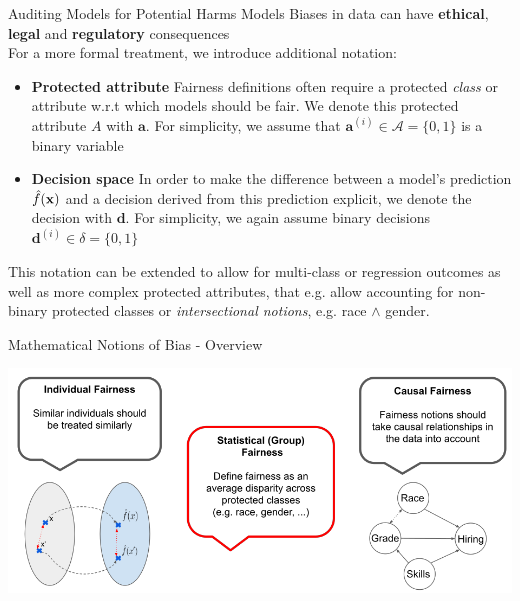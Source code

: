\documentclass[11pt,compress,t,notes=noshow, xcolor=table]{beamer}
\newcommand{\dv}{\mathbf{d}} %
\newcommand{\av}{\mathbf{a}} %
\newcommand{\Dspace}{\delta} %
\newcommand{\Aspace}{\mathcal{A}} %
\begin{document}
\begin{vbframe}{Auditing Models for Potential Harms}
  Models Biases in data can have \textbf{ethical}, \textbf{legal} and \textbf{regulatory} consequences \\
  For a more formal treatment, we introduce additional notation:
  \begin{itemize}
    \item \textbf{Protected attribute} Fairness definitions often require a protected \emph{class} or attribute w.r.t which models should be fair.
    We denote this protected attribute $A$ with $\av$. For simplicity, we assume that $\av^{(i)} \in \Aspace = \{0,1\}$ is a binary variable
    \item \textbf{Decision space} In order to make the difference between a model's prediction $\hat{f}(\mathbf{x})$ and a decision derived from this prediction explicit,
    we denote the decision  with $\dv$. For simplicity, we again assume binary decisions $\dv^{(i)} \in \Dspace = \{0, 1\}$
  \end{itemize}

This notation can be extended to allow for multi-class or regression outcomes as well as more complex protected attributes,
that e.g. allow accounting for non-binary protected classes or \emph{intersectional notions}, e.g. race $\land$ gender.
\end{vbframe}

\begin{vbframe}{Mathematical Notions of Bias - Overview}
\begin{center}
  \vspace{.5cm}
  \includegraphics[width=\textwidth]{figures/fairness_definitions.png}
\end{center}
\end{vbframe}
\end{document}
